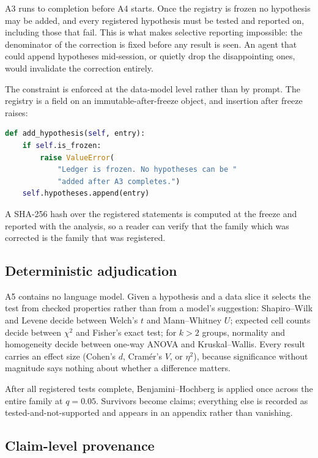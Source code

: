 \documentclass[10pt,twocolumn]{article}
\begin{document}
A3 runs to completion before A4 starts. Once the registry is frozen no
hypothesis may be added, and every registered hypothesis must be tested and
reported on, including those that fail. This is what makes selective reporting
impossible: the denominator of the correction is fixed before any result is
seen. An agent that could append hypotheses mid-session, or quietly drop the
disappointing ones, would invalidate the correction entirely.

The constraint is enforced at the data-model level rather than by prompt. The
registry is a field on an immutable-after-freeze object, and insertion after
freeze raises:

\begin{lstlisting}[language=Python]
def add_hypothesis(self, entry):
    if self.is_frozen:
        raise ValueError(
            "Ledger is frozen. No hypotheses can be "
            "added after A3 completes.")
    self.hypotheses.append(entry)
\end{lstlisting}

\noindent
A SHA-256 hash over the registered statements is computed at the freeze and
reported with the analysis, so a reader can verify that the family which was
corrected is the family that was registered.

\subsection{Deterministic adjudication}

A5 contains no language model. Given a hypothesis and a data slice it selects
the test from checked properties rather than from a model's suggestion:
Shapiro--Wilk and Levene decide between Welch's $t$ and Mann--Whitney $U$;
expected cell counts decide between $\chi^2$ and Fisher's exact test; for $k>2$
groups, normality and homogeneity decide between one-way ANOVA and
Kruskal--Wallis. Every result carries an effect size (Cohen's $d$, Cram\'er's
$V$, or $\eta^2$), because significance without magnitude says nothing about
whether a difference matters.

After all registered tests complete, Benjamini--Hochberg is applied once across
the entire family at $q = 0.05$. Survivors become claims; everything else is
recorded as tested-and-not-supported and appears in an appendix rather than
vanishing.

\subsection{Claim-level provenance}
\end{document}
